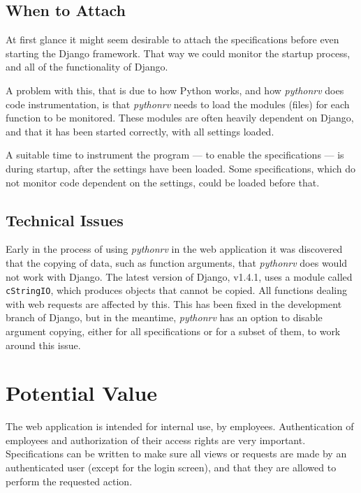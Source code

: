 \subsection{When to Attach}

At first glance it might seem desirable to attach the specifications before
even starting the Django framework. That way we could monitor the startup
process, and all of the functionality of Django.

A problem with this, that is due to how Python works, and how \textit{pythonrv}
does code instrumentation, is that \textit{pythonrv} needs to load the modules
(files) for each function to be monitored. These modules are often heavily
dependent on Django, and that it has been started correctly, with all settings
loaded.

A suitable time to instrument the program --- to enable the specifications ---
is during startup, after the settings have been loaded. Some specifications,
which do not monitor code dependent on the settings, could be loaded before
that.


\subsection{Technical Issues}

Early in the process of using \textit{pythonrv} in the web application it was
discovered that the copying of data, such as function arguments, that
\textit{pythonrv} does would not work with Django. The latest version of
Django, v1.4.1, uses a module called \texttt{cStringIO}, which produces objects
that cannot be copied. All functions dealing with web requests are affected by
this. This has been fixed in the development branch of Django, but in the
meantime, \textit{pythonrv} has an option to disable argument copying, either
for all specifications or for a subset of them, to work around this issue.


\section{Potential Value}

The web application is intended for internal use, by employees.  Authentication
of employees and authorization of their access rights are very important.
Specifications can be written to make sure all views or requests are made by an
authenticated user (except for the login screen), and that they are allowed to
perform the requested action.

